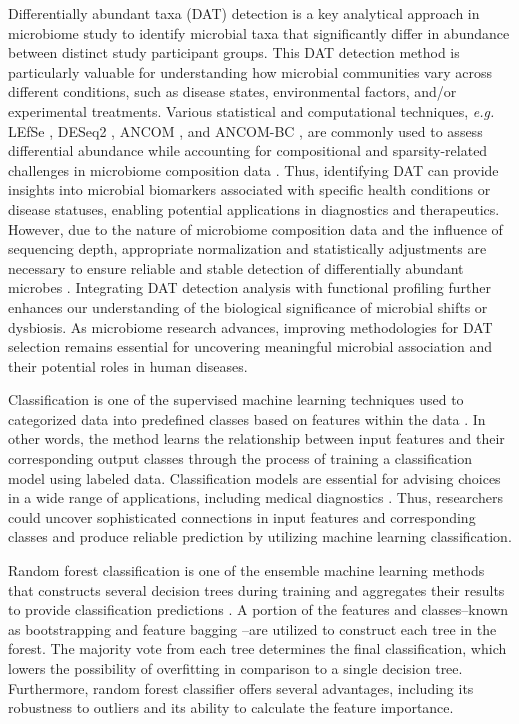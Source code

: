 \documentclass[11pt, a4paper, onecolumn, oneside]{report}
\begin{document}
        Differentially abundant taxa (DAT) detection is a key analytical approach in microbiome study to identify microbial taxa that significantly differ in abundance between distinct study participant groups. This DAT detection method is particularly valuable for understanding how microbial communities vary across different conditions, such as disease states, environmental factors, and/or experimental treatments. Various statistical and computational techniques, \textit{e.g.} LEfSe \cite{LEfSe-1}, DESeq2 \cite{DESeq2-1}, ANCOM \cite{ANCOM-1}, and ANCOM-BC \cite{ANCOM-BC-1, ANCOM-BC-2}, are commonly used to assess differential abundance while accounting for compositional and sparsity-related challenges in microbiome composition data \cite{DAT-1, DAT-2}. Thus, identifying DAT can provide insights into microbial biomarkers associated with specific health conditions or disease statuses, enabling potential applications in diagnostics and therapeutics. However, due to the nature of microbiome composition data and the influence of sequencing depth, appropriate normalization and statistically adjustments are necessary to ensure reliable and stable detection of differentially abundant microbes \cite{DAT-3, DAT-4}. Integrating DAT detection analysis with functional profiling further enhances our understanding of the biological significance of microbial shifts or dysbiosis. As microbiome research advances, improving methodologies for DAT selection remains essential for uncovering meaningful microbial association and their potential roles in human diseases.

        Classification is one of the supervised machine learning techniques used to categorized data into predefined classes based on features within the data \cite{classification-1, classification-2}. In other words, the method learns the relationship between input features and their corresponding output classes through the process of training a classification model using labeled data. Classification models are essential for advising choices in a wide range of applications, including medical diagnostics \cite{classification-analysis-1}. Thus, researchers could uncover sophisticated connections in input features and corresponding classes and produce reliable prediction by utilizing machine learning classification.

        Random forest classification is one of the ensemble machine learning methods that constructs several decision trees during training and aggregates their results to provide classification predictions \cite{RF-1}. A portion of the features and classes--known as bootstrapping \cite{RF-2, RF-3, RF-4} and feature bagging \cite{RF-5, RF-6, RF-7}--are utilized to construct each tree in the forest. The majority vote from each tree determines the final classification, which lowers the possibility of overfitting in comparison to a single decision tree. Furthermore, random forest classifier offers several advantages, including its robustness to outliers and its ability to calculate the feature importance.
\end{document}
